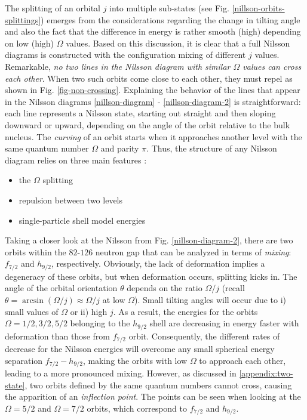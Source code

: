 The splitting of an orbital $j$ into multiple sub-states (see Fig. \ref{nillson-orbits-splittings}) emerges from the considerations regarding the change in tilting angle and also the fact that the difference in energy is rather smooth (high) depending on low (high) $\Omega$ values. Based on this discussion, it is clear that a full Nilsson diagrams is constructed with the configuration mixing of different $j$ values.
Remarkable, \emph{no two lines in the Nilsson diagram with similar $\Omega$ values can cross each other}. When two such orbits come close to each other, they must repel as shown in Fig. \ref{fig-non-crossing}. Explaining the behavior of the lines that appear in the Nilsson diagrams \ref{nillson-diagram} - \ref{nillson-diagram-2} is straightforward: each line represents a Nilsson state, starting out straight and then sloping downward or upward, depending on the angle of the orbit relative to the bulk nucleus. The \emph{curving} of an orbit starts when it approaches another level with the same quantum number $\Omega$ and parity $\pi$. Thus, the structure of any Nilsson diagram relies on three main features \cite{casten2000nuclear}:
\begin{itemize}
    \item the $\Omega$ splitting
    \item repulsion between two levels
    \item single-particle shell model energies
\end{itemize}

Taking a closer look at the Nilsson from Fig. \ref{nillson-diagram-2}, there are two orbits within the $82$-$126$ neutron gap that can be analyzed in terms of \emph{mixing}: $f_{7/2}$ and $h_{9/2}$, respectively. Obviously, the lack of deformation implies a degeneracy of these orbits, but when deformation occurs, splitting kicks in. The angle of the orbital orientation $\theta$ depends on the ratio $\Omega/j$ (recall $\theta=\arcsin(\Omega/j)\approx\Omega/j$ at low $\Omega$). Small tilting angles will occur due to i) small values of $\Omega$ or ii) high $j$. As a result, the energies for the orbits $\Omega=1/2,3/2,5/2$ belonging to the $h_{9/2}$ shell are decreasing in energy faster with deformation than those from $f_{7/2}$ orbit. Consequently, the different rates of decrease for the Nilsson energies will overcome any small spherical energy separation $f_{7/2}-h_{9/2}$, making the orbits with low $\Omega$ to approach each other, leading to a more pronounced mixing. However, as discussed in \ref{appendix:two-state}, two orbits defined by the same quantum numbers cannot cross, causing the apparition of an \emph{inflection point}. The points can be seen when looking at the $\Omega=5/2$ and $\Omega=7/2$ orbits, which correspond to $f_{7/2}$ and $h_{9/2}$.

